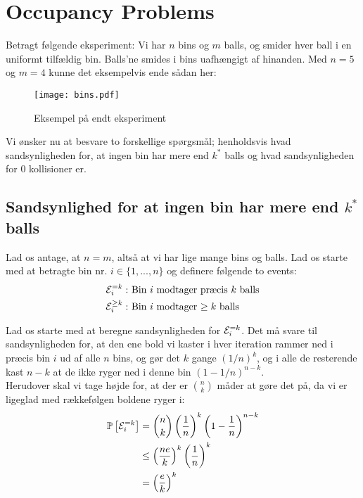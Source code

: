 \section{Occupancy Problems}
Betragt følgende eksperiment: Vi har $n$ bins og $m$ balls, og smider hver ball i en uniformt tilfældig bin. Balls'ne smides i bins uafhængigt af hinanden. Med $n = 5$ og $m = 4$ kunne det eksempelvis ende sådan her:

\begin{figure}[H]
  \begin{center}
  \texttt{[image: bins.pdf]}
  \end{center}
  \caption{Eksempel på endt eksperiment}
  \label{fig:bins}
\end{figure}


Vi ønsker nu at besvare to forskellige spørgsmål; henholdsvis hvad sandsynligheden for, at ingen bin har mere end $k^\ast$ balls og hvad sandsynligheden for 0 kollisioner er.

\subsection{Sandsynlighed for at ingen bin har mere end $k^\ast$ balls}
Lad os antage, at $n = m$, altså at vi har lige mange bins og balls. Lad os starte med at betragte bin nr. $i \in \{ 1, ..., n \}$ og definere følgende to events:
\begin{align*}
  {\mathcal{E}}_i^{=k}:& \text{ Bin $i$ modtager præcis $k$ balls}\\
  {\mathcal{E}}_i^{\geq k}:& \text{ Bin $i$ modtager $\geq k$ balls}
\end{align*}

Lad os starte med at beregne sandsynligheden for ${\mathcal{E}}_i^{=k}$. Det må svare til sandsynligheden for, at den ene bold vi kaster i hver iteration rammer ned i præcis bin $i$ ud af alle $n$ bins, og gør det $k$ gange $(1/n)^k$, og i alle de resterende kast $n-k$ at de ikke ryger ned i denne bin $(1 - 1/n)^{n-k}$.\\
Herudover skal vi tage højde for, at der er $\binom{n}{k}$ måder at gøre det på, da vi er ligeglad med rækkefølgen boldene ryger i:
\begin{align}
  \mathbb{P} \left[  {\mathcal{E}}_i^{=k}  \right] &= \binom{n}{k} \left( \frac{1}{n} \right)^k \left( 1 - \frac{1}{n}  \right)^{n-k} \label{eq:event-i-lig-k} \\
  &\leq \left( \frac{ne}{k} \right)^k \left( \frac{1}{n} \right)^k \label{eq:prop-b.2.3} \\
  &= \left( \frac{e}{k} \right)^k \label{eq:res-bestemt-k}
\end{align}

